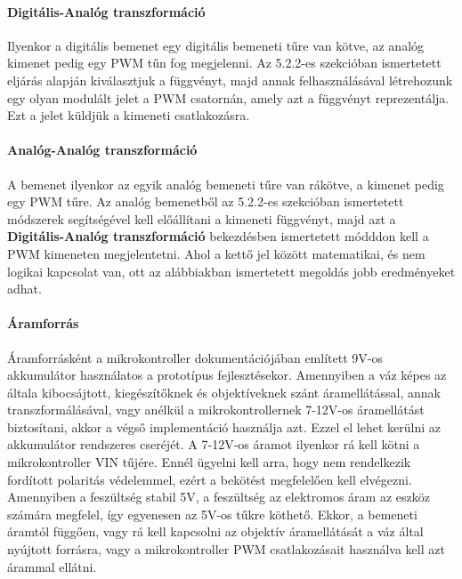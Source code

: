 \paragraph{Digitális-Analóg transzformáció}
Ilyenkor a digitális bemenet egy digitális bemeneti tűre van kötve, az analóg kimenet pedig egy PWM tűn fog megjelenni. Az 5.2.2-es szekcióban ismertetett eljárás alapján kiválasztjuk a függvényt, majd annak felhasználásával létrehozunk egy olyan modulált jelet a PWM csatornán, amely azt a függvényt reprezentálja. Ezt a jelet küldjük a kimeneti csatlakozásra.
\paragraph{Analóg-Analóg transzformáció}
A bemenet ilyenkor az egyik analóg bemeneti tűre van rákötve, a kimenet pedig egy PWM tűre. Az analóg bemenetből az 5.2.2-es szekcióban ismertetett módszerek segítségével kell előállítani a kimeneti függvényt, majd azt a \textbf{Digitális-Analóg transzformáció} bekezdésben ismertetett módddon kell a PWM kimeneten megjelentetni. Ahol a kettő jel között matematikai, és nem logikai kapcsolat van, ott az alábbiakban ismertetett megoldás jobb eredményeket adhat.

\paragraph{Áramforrás}
Áramforrásként a  mikrokontroller dokumentációjában említett 9V-os akkumulátor használatos a prototípus fejlesztésekor. Amennyiben a váz képes az általa kibocsájtott, kiegészítőknek és objektíveknek szánt áramellátással, annak transzformálásával, vagy anélkül a mikrokontrollernek 7-12V-os\cite{arduino_aram} áramellátást biztosítani, akkor a végső implementáció használja azt. Ezzel el lehet kerülni az akkumulátor rendszeres cseréjét. A 7-12V-os áramot ilyenkor rá kell kötni a mikrokontroller VIN tűjére. Ennél ügyelni kell arra, hogy nem rendelkezik fordított polaritás védelemmel, ezért a bekötést megfelelően kell elvégezni.\cite{arduino_docs} Amennyiben a feszültség stabil 5V, a feszültség az elektromos áram az eszköz számára megfelel, így egyenesen az 5V-os tűkre köthető. Ekkor, a bemeneti áramtól függően, vagy rá kell kapcsolni az objektív áramellátását a váz által nyújtott forrásra, vagy a mikrokontroller PWM csatlakozásait használva kell azt árammal ellátni.

